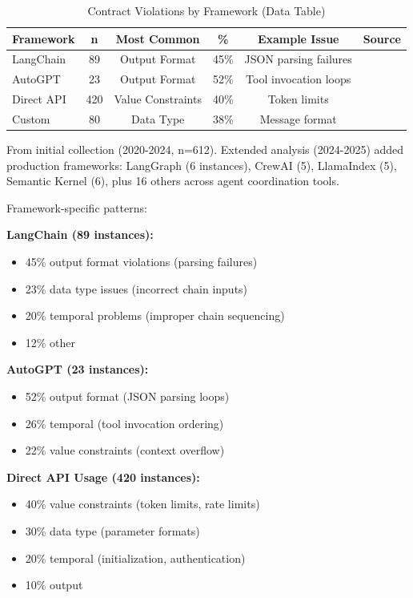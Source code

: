 \documentclass[11pt]{article}
\begin{document}
\begin{table}[h]
\centering
\caption{Contract Violations by Framework (Data Table)}
\label{tab:framework_violations}
\begin{tabular}{lccccc}
\toprule
\textbf{Framework} & \textbf{n} & \textbf{Most Common} & \textbf{\%} & \textbf{Example Issue} & \textbf{Source} \\
\midrule
LangChain & 89 & Output Format & 45\% & JSON parsing failures & \cite{githublangchain22103} \\
AutoGPT & 23 & Output Format & 52\% & Tool invocation loops & \cite{githubautogpt1994} \\
Direct API & 420 & Value Constraints & 40\% & Token limits & \cite{stackoverflow75396481} \\
Custom & 80 & Data Type & 38\% & Message format & \cite{stackoverflow78566807} \\
\bottomrule
\end{tabular}
\vspace{0.1cm}
\footnotesize{From initial collection (2020-2024, n=612). Extended analysis (2024-2025) added production frameworks: LangGraph (6 instances), CrewAI (5), LlamaIndex (5), Semantic Kernel (6), plus 16 others across agent coordination tools.}
\end{table}

Framework-specific patterns:

\textbf{LangChain (89 instances):}
\begin{itemize}
    \item 45\% output format violations (parsing failures)~\cite{githublangchain22103}
    \item 23\% data type issues (incorrect chain inputs)
    \item 20\% temporal problems (improper chain sequencing)
    \item 12\% other
\end{itemize}

\textbf{AutoGPT (23 instances):}
\begin{itemize}
    \item 52\% output format (JSON parsing loops)~\cite{githubautogpt2957}
    \item 26\% temporal (tool invocation ordering)
    \item 22\% value constraints (context overflow)
\end{itemize}

\textbf{Direct API Usage (420 instances):}
\begin{itemize}
    \item 40\% value constraints (token limits, rate limits)~\cite{stackoverflow75041580}
    \item 30\% data type (parameter formats)
    \item 20\% temporal (initialization, authentication)~\cite{stackoverflow76796341}
    \item 10\% output
\end{itemize}
\end{document}
